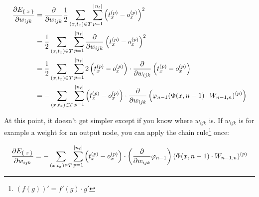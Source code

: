 \begin{align}
    \frac{\partial E_{\Set{x}}}{\partial w_{ijk}}
    &= \frac{\partial}{\partial w_{ijk}} \frac{1}{2} \sum_{(x, t_x) \in T} \sum_{p = 1}^{|n_{\ell}|} \left (t_{x}^{(p)} - o_{x}^{(p)} \right )^2\\
    &= \frac{1}{2} \sum_{(x, t_x) \in T} \sum_{p = 1}^{|n_{\ell}|} \frac{\partial}{\partial w_{ijk}} \left (t_{x}^{(p)} - o_{x}^{(p)} \right )^2\\
    &= \frac{1}{2} \sum_{(x, t_x) \in T} \sum_{p = 1}^{|n_{\ell}|} 2 \left (t_{x}^{(p)} - o_{x}^{(p)} \right ) \cdot \frac{\partial}{\partial w_{ijk}} \left (t_{x}^{(p)} - o_{x}^{(p)} \right )\\
    &= - \sum_{(x, t_x) \in T} \sum_{p = 1}^{|n_{\ell}|} \left (t_{x}^{(p)} - o_{x}^{(p)} \right ) \cdot \frac{\partial}{\partial w_{ijk}} \left (\varphi_{n-1}(\Phi(x, n-1) \cdot W_{n-1,n})^{(p)} \right)
\end{align}

At this point, it doesn't get simpler except if you know where $w_{ijk}$ is.
If $w_{ijk}$ is for example a weight for an output node, you can apply the chain
rule\footnote{$(f(g))' = f'(g) \cdot g'$} once:

\begin{align}
    \frac{\partial E_{\Set{x}}}{\partial w_{ijk}} &= - \sum_{(x, t_x) \in T} \sum_{p = 1}^{|n_{\ell}|} \left (t_{x}^{(p)} - o_{x}^{(p)} \right ) \cdot \left ( \frac{\partial}{\partial w_{ijk}} \varphi_{n-1} \right )(\Phi(x, n-1) \cdot W_{n-1,n})^{(p)}\\
\end{align}